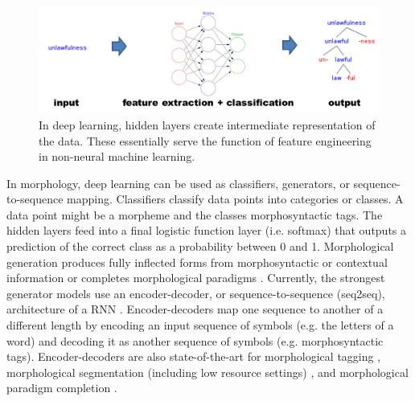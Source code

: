 \documentclass[12pt]{article}
\begin{document}
\begin{figure}[ht]
\label{fig:DL}
\begin{center}
\includegraphics[width=0.95\columnwidth]{DL.PNG}
\caption{In deep learning, hidden layers create intermediate representation of the data. These essentially serve the function of feature engineering in non-neural machine learning.}
\end{center}
\end{figure}

In morphology, deep learning can be used as classifiers, generators, or sequence-to-sequence mapping. Classifiers classify data points into categories or classes. A data point might be a morpheme and the classes morphosyntactic tags. 
The hidden layers feed into a final logistic function layer (i.e. softmax) that outputs a prediction of the correct class as a probability between 0 and 1. Morphological generation produces fully inflected forms from morphosyntactic or contextual information \cite{cotterell_conll-sigmorphon_2017} or completes morphological paradigms \cite{malouf_generating_2016}. Currently, the strongest generator models use an encoder-decoder, or sequence-to-sequence (seq2seq), architecture of a RNN \cite{sutskever2014,kann_neural_2016}. Encoder-decoders map one sequence to another of a different length by encoding an input sequence of symbols (e.g. the letters of a word) and decoding it as another sequence of symbols (e.g. morphosyntactic tags). Encoder-decoders are also state-of-the-art for morphological tagging \cite{heigold_extensive_2017}, morphological segmentation (including low resource settings) \cite{kann_fortification_2018}, and morphological paradigm completion \cite{cotterell_conllsigmorphon_2018}. 
\end{document}
